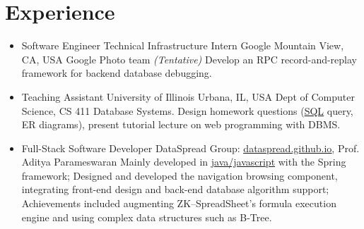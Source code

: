 \documentclass[11pt,a4paper,sans]{moderncv}        %
\begin{document}
\section{Experience}
\begin{itemize}
	
	\item{
	      {Software Engineer Technical Infrastructure Intern}
	      {Google}
	      {Mountain View, CA, USA}
	      {Google Photo team}
	      {\emph{(Tentative)} Develop an RPC record-and-replay framework for backend database debugging.}
	      }
	      
	
	\item{
	      {Teaching Assistant}
	      {University of Illinois}
	      {Urbana, IL, USA}
	      {Dept of Computer Science, CS 411 Database Systems.}
	      {Design homework questions (\underline{SQL} query, ER diagrams), present tutorial lecture on web programming with DBMS.}
	      }
	      
	\item{
	      {Full-Stack Software Developer}
	      {\vspace{-10pt}}
	      {}
	      {DataSpread Group:
		      \href{https://dataspread.github.io}{\underline{dataspread.github.io}}, Prof. Aditya Parameswaran}
	      {
		      Mainly developed in \underline{java/javascript} with the Spring framework;
		      Designed and developed the navigation browsing component, integrating front-end design and back-end database algorithm support;
		      Achievements included augmenting ZK--SpreadSheet's formula execution engine and using complex data structures such as B-Tree.}
	      }
	      
	      

\end{itemize}
\end{document}
